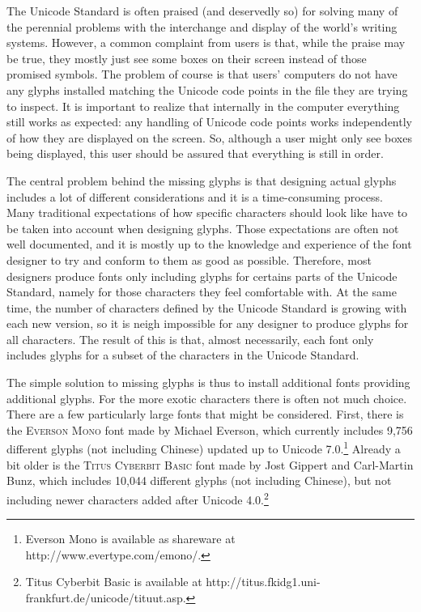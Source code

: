The Unicode Standard is often praised (and deservedly so) for solving many of the perennial problems with the interchange and display of the world's writing systems. However, a common complaint from users is that, while the praise may be true, they mostly just see some boxes on their screen instead of those promised symbols. The problem of course is that users' computers do not have any glyphs installed matching the Unicode code points in the file they are trying to inspect. It is important to realize that internally in the computer everything still works as expected: any handling of Unicode code points works independently of how they are displayed on the screen. So, although a user might only see boxes being displayed, this user should be assured that everything is still in order.

The central problem behind the missing glyphs is that designing actual glyphs includes a lot of different considerations and it is a time-consuming process. Many traditional expectations of how specific characters should look like have to be taken into account when designing glyphs. Those expectations are often not well documented, and it is mostly up to the knowledge and experience of the font designer to try and conform to them as good as possible. Therefore, most designers produce fonts only including glyphs for certains parts of the Unicode Standard, namely for those characters they feel comfortable with. At the same time, the number of characters defined by the Unicode Standard is growing with each new version, so it is neigh impossible for any designer to produce glyphs for all characters. The result of this is that, almost necessarily, each font only includes glyphs for a subset of the characters in the Unicode Standard.

The simple solution to missing glyphs is thus to install additional fonts providing additional glyphs. For the more exotic characters there is often not much choice. There are a few particularly large fonts that might be considered. First, there is the \textsc{Everson Mono} font made by Michael Everson, which currently includes 9,756 different glyphs (not including Chinese) updated up to Unicode 7.0.\footnote{Everson Mono is available as shareware at http://www.evertype.com/emono/.} Already a bit older is the \textsc{Titus Cyberbit Basic} font made by Jost Gippert and Carl-Martin Bunz, which includes 10,044 different glyphs (not including Chinese), but not including newer characters added after Unicode 4.0.\footnote{Titus Cyberbit Basic is available at http://titus.fkidg1.uni-frankfurt.de/unicode/tituut.asp.}

